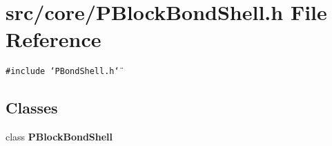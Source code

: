 \section{src/core/PBlock\-Bond\-Shell.h File Reference}
\label{PBlockBondShell_8h}


{\tt \#include \char`\"{}PBond\-Shell.h\char`\"{}}\par
\subsection*{Classes}
\begin{CompactItemize}
\item 
class {\bf PBlock\-Bond\-Shell}
\end{CompactItemize}
